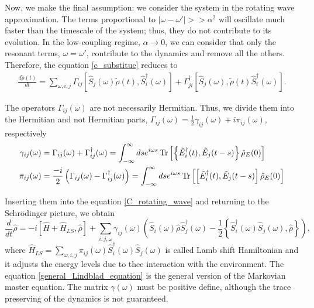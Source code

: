 Now, we make the final assumption: we consider the system in the rotating wave approximation. The terms proportional to $|\omega-\omega'| >> \alpha^2$ will oscillate much faster than the timescale of the system; thus, they do not contribute to its evolution. In the low-coupling regime, $\alpha\rightarrow 0$, we can consider that only the resonant terms, $\omega=\omega'$, contribute to the dynamics and remove all the others. Therefore, the equation \eqref{c_substitue} reduces to
\begin{eqnarray}\label{C_rotating_wave}
    \frac{d\tilde\rho(t)}{dt} = \sum_{\omega,i,j}\Gamma_{ij}\left[\hat S_j(\omega)\tilde\rho(t),\hat S_i^\dagger(\omega)\right]+\Gamma_{ji}^\dagger\left[\hat S_j(\omega),\tilde\rho(t)\hat S_i^\dagger(\omega)\right].
\end{eqnarray}

The operators $\Gamma_{ij}(\omega)$ are not necessarily Hermitian. Thus, we divide them into the Hermitian and not Hermitian parts, $\Gamma_{ij}(\omega) =\frac{1}{2}\gamma_{ij}(\omega)+i\pi_{ij}(\omega)$, respectively
\begin{equation}
    \begin{split}
        \gamma_{ij}(\omega) &=   \Gamma_{ij}(\omega) + \Gamma_{ij}^\dagger(\omega) = \int_{-\infty}^\infty ds e^{i\omega s}\operatorname{Tr}\left[\left\{\tilde E_i^\dagger(t),\tilde E_j(t-s)\right\}\hat\rho_E(0)\right]\\
        \pi_{ij}(\omega) &= \frac{-i}{2}\left(\Gamma_{ij}(\omega)-\Gamma_{ij}^\dagger(\omega)\right)=\int_{-\infty}^\infty ds e^{i\omega s}\operatorname{Tr}\left[\left[\tilde E_i^\dagger(t),\tilde E_j(t-s)\right]\hat\rho_E(0)\right]\\
    \end{split}
\end{equation}

Inserting them into the equation \eqref{C_rotating_wave} and returning to the Schrödinger picture, we obtain
\begin{equation}\label{general_Lindblad_equation}
    \frac{d}{dt}\hat\rho = -i\left[\hat H + \hat H_{LS},\hat\rho\right] + \sum_{i,j,\omega} \gamma_{ij}(\omega) \left(\hat S_i(\omega) \hat\rho \hat S^\dagger_j(\omega) - \frac{1}{2}\left\{ \hat S^\dagger_i(\omega)\hat S_j(\omega), \hat\rho\right\} \right),
\end{equation}
where $\hat H_{LS} = \sum_{\omega,i,j} \pi_{ij}(\omega)\hat S^\dagger_i(\omega)\hat S_j(\omega)$ is called Lamb shift Hamiltonian and it adjusts the energy levels due to thee interaction with the environment. The equation \eqref{general_Lindblad_equation} is the general version of the Markovian master equation. The matrix $\gamma(\omega)$ must be positive define, although the trace preserving of the dynamics is not guaranteed.

